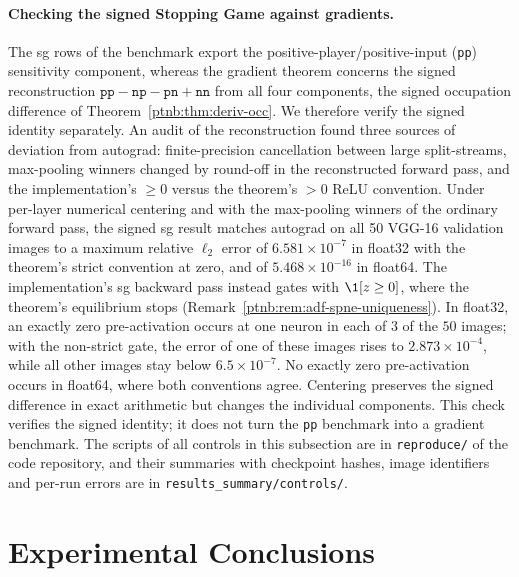 \paragraph{Checking the signed Stopping Game against gradients.}
The \ac{sg} rows of the benchmark export the positive-player/positive-input (\texttt{pp}) sensitivity component, whereas the gradient theorem concerns the signed reconstruction $\texttt{pp}-\texttt{np}-\texttt{pn}+\texttt{nn}$ from all four components, the signed occupation difference of Theorem~\ref{ptnb:thm:deriv-occ}. We therefore verify the signed identity separately. An audit of the reconstruction found three sources of deviation from autograd: finite-precision cancellation between large split-streams, max-pooling winners changed by round-off in the reconstructed forward pass, and the implementation's $\ge0$ versus the theorem's $>0$ ReLU convention. Under per-layer numerical centering and with the max-pooling winners of the ordinary forward pass, the signed \ac{sg} result matches autograd on all 50 VGG-16 validation images to a maximum relative $\ell_2$ error of $6.581\times10^{-7}$ in float32 with the theorem's strict convention at zero, and of $5.468\times10^{-16}$ in float64. The implementation's \ac{sg} backward pass instead gates with $\1[z\ge0]$, where the theorem's equilibrium stops (Remark~\ref{ptnb:rem:adf-spne-uniqueness}). In float32, an exactly zero pre-activation occurs at one neuron in each of $3$ of the $50$ images; with the non-strict gate, the error of one of these images rises to $2.873\times10^{-4}$, while all other images stay below $6.5\times10^{-7}$. No exactly zero pre-activation occurs in float64, where both conventions agree. Centering preserves the signed difference in exact arithmetic but changes the individual components. This check verifies the signed identity; it does not turn the \texttt{pp} benchmark into a gradient benchmark. The scripts of all controls in this subsection are in \nolinkurl{reproduce/} of the code repository, and their summaries with checkpoint hashes, image identifiers and per-run errors are in \nolinkurl{results_summary/controls/}.

\section{Experimental Conclusions}\label{sec:experimental_conclusions}

